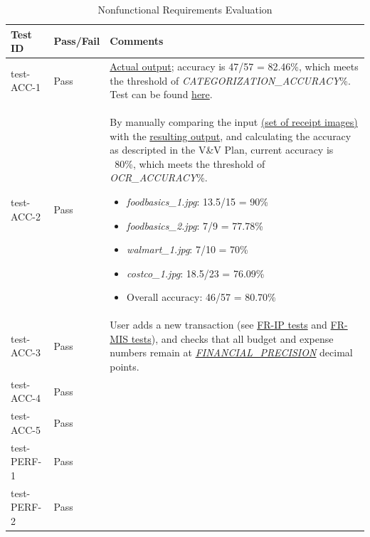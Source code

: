 \documentclass[12pt, titlepage]{article}
\begin{document}
\begin{longtable}{>{\centering\arraybackslash}p{} >{\centering\arraybackslash}p{} >{\centering\arraybackslash}p{}}
  \caption{Nonfunctional Requirements Evaluation}\\
    \toprule
    \textbf{Test ID} & \textbf{Pass/Fail} & \textbf{Comments} \\
    \midrule
    test-ACC-1 & Pass &
    \href{https://github.com/PlutosCapstone/Plutos/tree/main/src/server/tests/imageProcessing/data/categorization/receipt_items_output.csv}{Actual
    output}; accuracy is 47/57 = 82.46\%, which meets the threshold of
    \textit{CATEGORIZATION\_ACCURACY}\%. Test can be found
    \href{https://github.com/PlutosCapstone/Plutos/blob/main/src/server/tests/imageProcessing/test_categorization.py}{here}.
    \\
    test-ACC-2 & Pass & By manually comparing the input
    \href{https://github.com/PlutosCapstone/Plutos/tree/main/src/server/tests/imageProcessing/data/parsing/input}{
    (set of receipt images)} with the
    \href{https://github.com/PlutosCapstone/Plutos/tree/main/src/server/tests/imageProcessing/data/parsing/input}{resulting
    output}, and calculating the accuracy as descripted in the V\&V Plan,
    current accuracy is ~80\%, which meets the threshold of \textit{OCR\_ACCURACY}\%.
    \begin{itemize}
      \item \textit{foodbasics\_1.jpg}: 13.5/15 = 90\%
      \item \textit{foodbasics\_2.jpg}: 7/9 = 77.78\%
      \item \textit{walmart\_1.jpg}: 7/10 = 70\%
      \item \textit{costco\_1.jpg}: 18.5/23 = 76.09\%
      \item Overall accuracy: 46/57 = 80.70\%
    \end{itemize}\\
    test-ACC-3 & Pass & User adds a new transaction (see
    \hyperref[sec:FR-IP]{FR-IP tests} and \hyperref[sec:FR-MIS]{FR-MIS tests}),
    and checks that all budget and expense numbers remain at
    \href{https://github.com/PlutosCapstone/Plutos/blob/main/docs/SRS/SRS.pdf}{\textit{FINANCIAL\_PRECISION}}
    decimal points. \\
    test-ACC-4 & Pass &  \\
    test-ACC-5 & Pass &  \\
    \midrule
    test-PERF-1 & Pass &  \\
    test-PERF-2 & Pass &  \\

\end{longtable}
\end{document}
